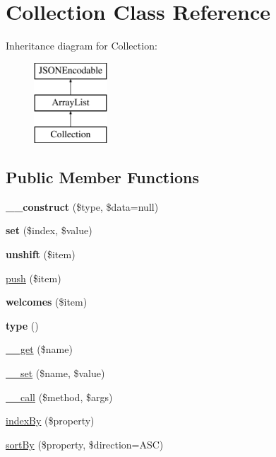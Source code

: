 \hypertarget{classCollection}{
\section{Collection Class Reference}
\label{classCollection}
}
Inheritance diagram for Collection:\begin{figure}[H]
\begin{center}
\leavevmode
\includegraphics[height=3.000000cm]{classCollection}
\end{center}
\end{figure}
\subsection*{Public Member Functions}
\begin{DoxyCompactItemize}
\item 
\hypertarget{classCollection_a24944b0b4138f2d5ec0a1cbb9bc85ade}{
{\bfseries \_\-\_\-construct} (\$type, \$data=null)}
\label{classCollection_a24944b0b4138f2d5ec0a1cbb9bc85ade}

\item 
\hypertarget{classCollection_a1d8e8a80564ac93eb8d636e7877447ec}{
{\bfseries set} (\$index, \$value)}
\label{classCollection_a1d8e8a80564ac93eb8d636e7877447ec}

\item 
\hypertarget{classCollection_aebaa5b4f4f01e5bb8cd80a6b8d68358b}{
{\bfseries unshift} (\$item)}
\label{classCollection_aebaa5b4f4f01e5bb8cd80a6b8d68358b}

\item 
\hyperlink{classCollection_afa19de785c3fb54f187786782d082733}{push} (\$item)
\item 
\hypertarget{classCollection_ab889e651767d1598189ab61b4a3c75f8}{
{\bfseries welcomes} (\$item)}
\label{classCollection_ab889e651767d1598189ab61b4a3c75f8}

\item 
\hypertarget{classCollection_a3db7e9a0b39b65f39677b549364547f3}{
{\bfseries type} ()}
\label{classCollection_a3db7e9a0b39b65f39677b549364547f3}

\item 
\hyperlink{classCollection_a20622fcde06bbba3f05487f26773eef6}{\_\-\_\-get} (\$name)
\item 
\hyperlink{classCollection_a9e79c3f33f3780c717b06ba727484dcc}{\_\-\_\-set} (\$name, \$value)
\item 
\hyperlink{classCollection_aa4a0ddb57505aa399a273b061e997108}{\_\-\_\-call} (\$method, \$args)
\item 
\hyperlink{classCollection_a2ed1317fa00c1096a60a6877e1fa245f}{indexBy} (\$property)
\item 
\hyperlink{classCollection_a8d86dc7d75820b2646ee91f79317feec}{sortBy} (\$property, \$direction=ASC)
\end{DoxyCompactItemize}
